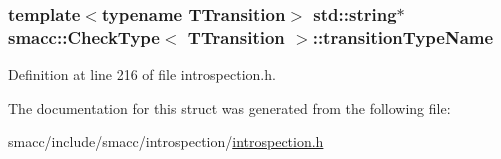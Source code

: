 \subsubsection[{\texorpdfstring{transition\+Type\+Name}{transitionTypeName}}]{\setlength{\rightskip}{0pt plus 5cm}template$<$typename T\+Transition$>$ std\+::string$\ast$ {\bf smacc\+::\+Check\+Type}$<$ T\+Transition $>$\+::transition\+Type\+Name}\hypertarget{structsmacc_1_1CheckType_a6402dc8352758d361781773dc1e8523f}{}\label{structsmacc_1_1CheckType_a6402dc8352758d361781773dc1e8523f}


Definition at line 216 of file introspection.\+h.



The documentation for this struct was generated from the following file\+:\begin{DoxyCompactItemize}
\item 
smacc/include/smacc/introspection/\hyperlink{introspection_8h}{introspection.\+h}\end{DoxyCompactItemize}
